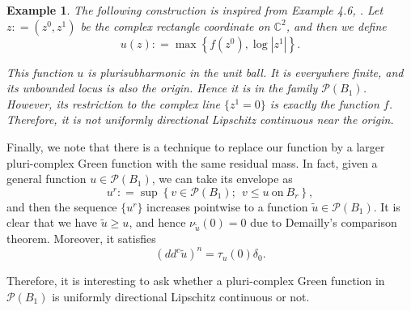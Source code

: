 \documentclass[a4paper,11pt]{amsart}
\numberwithin{equation}{section}
\newtheorem{example}[theorem]{Example}
\def\cP{{\mathcal P}}
\def\cP{{\mathcal P}}
\def\bC{{\mathbb C}}
\def\bP{{\mathbb P}}
\def\z{{\zeta}}
\begin{document}
\begin{example}
\label{exm-001}
The following construction is inspired from Example 4.6, \cite{ACH15}. 
Let $z: = (z^0, z^1)$ be the complex rectangle coordinate on $\bC^2$, 
and then we define 
\begin{equation}
\label{ex-001}
u(z): = \max\left\{ f(z^0), \log |z^1|    \right\}.
\end{equation}


This function $u$  is plurisubharmonic in the unit ball. 
It is everywhere finite, and its unbounded locus is also the origin. 
Hence it is in the family $\cP(B_1)$. 
However,
its restriction to the complex line $\{ z^1=0 \}$ is exactly the function $f$.  
Therefore, it is not uniformly directional Lipschitz continuous near the origin. 




\end{example}

Finally, we note that there is a technique \cite{ACH19}  to 
replace our function by a larger pluri-complex Green function 
with the same residual mass. 
In fact, given a general function $u\in \cP(B_1)$, 
we can take its envelope as 
 $$ u^r: = \sup \left\{  v\in \cP(B_1); \ \ v\leq u \  \mbox{on} \   B_r \right\}, $$
and then the sequence $\{ u^r \}$ increases pointwise to a function $\tilde{u}\in \cP(B_1)$. 
It is clear that we have $\tilde{u} \geq u$,
and hence $\nu_{\tilde{u}}(0)=0$ due to Demailly's comparison theorem. 
Moreover, it satisfies 
$$ (dd^c \tilde{u})^n = \tau_u(0) \delta_0. $$

Therefore, it is interesting to ask whether a pluri-complex Green function in $\cP(B_1)$
is uniformly directional Lipschitz continuous or not. 
\end{document}
